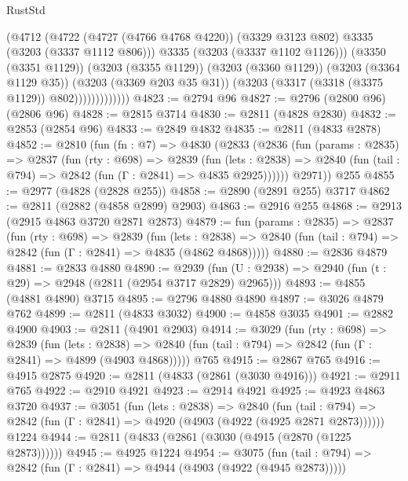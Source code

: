 \begin{lexlean}{RustStd}
\begin{coremodule}
                          (@4712
                            (@4722
                              (@4727 (@4766 @4768 @4220))
                              (@3329 @3123 @802)
                              @3335
                              (@3203 (@3337 @1112 @806)))
                            @3335
                            (@3203 (@3337 @1102 @1126)))
                          (@3350 (@3351 @1129))
                          (@3203 (@3355 @1129))
                          (@3203 (@3360 @1129))
                          (@3203 (@3364 @1129 @35))
                          (@3203 (@3369 @203 @35 @31))
                          (@3203 (@3317 (@3318 (@3375 @1129)) @802)))))))))))))
@4823 := @2794 @96
@4827 := @2796 (@2800 @96) (@2806 @96)
@4828 := @2815 @3714
@4830 := @2811 (@4828 @2830)
@4832 := @2853 (@2854 @96)
@4833 := @2849 @4832
@4835 := @2811 (@4833 @2878)
@4852 := @2810
    (fun (fn : @7) =>
    @4830
      (@2833
        (@2836
          (fun (params : @2835) =>
          @2837
            (fun (rty : @698) =>
            @2839
              (fun (lets : @2838) =>
              @2840 (fun (tail : @794) => @2842 (fun (Γ : @2841) => @4835 @2925))))))
        @2971))
    @255
@4855 := @2977 (@4828 (@2828 @255))
@4858 := @2890 (@2891 @255) @3717
@4862 := @2811 (@2882 (@4858 @2899) @2903)
@4863 := @2916 @255
@4868 := @2913 (@2915 @4863 @3720 @2871 @2873)
@4879 := fun (params : @2835) =>
  @2837
    (fun (rty : @698) =>
    @2839
      (fun (lets : @2838) =>
      @2840 (fun (tail : @794) => @2842 (fun (Γ : @2841) => @4835 (@4862 @4868)))))
@4880 := @2836 @4879
@4881 := @2833 @4880
@4890 := @2939 (fun (U : @2938) => @2940 (fun (t : @29) => @2948 (@2811 (@2954 @3717 @2829) @2965)))
@4893 := @4855 (@4881 @4890) @3715
@4895 := @2796 @4880 @4890
@4897 := @3026 @4879 @762
@4899 := @2811 (@4833 @3032)
@4900 := @4858 @3035
@4901 := @2882 @4900
@4903 := @2811 (@4901 @2903)
@4914 := @3029
    (fun (rty : @698) =>
    @2839
      (fun (lets : @2838) =>
      @2840 (fun (tail : @794) => @2842 (fun (Γ : @2841) => @4899 (@4903 @4868)))))
    @765
@4915 := @2867 @765
@4916 := @4915 @2875
@4920 := @2811 (@4833 (@2861 (@3030 @4916)))
@4921 := @2911 @765
@4922 := @2910 @4921
@4923 := @2914 @4921
@4925 := @4923 @4863 @3720
@4937 := @3051
    (fun (lets : @2838) =>
    @2840
      (fun (tail : @794) => @2842 (fun (Γ : @2841) => @4920 (@4903 (@4922 (@4925 @2871 @2873))))))
    @1224
@4944 := @2811 (@4833 (@2861 (@3030 (@4915 (@2870 (@1225 @2873))))))
@4945 := @4925 @1224
@4954 := @3075
    (fun (tail : @794) => @2842 (fun (Γ : @2841) => @4944 (@4903 (@4922 (@4945 @2873)))))

\end{coremodule}
\end{lexlean}
